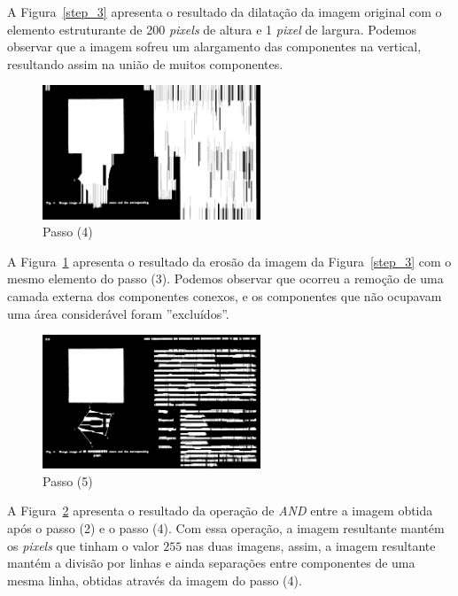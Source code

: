 \documentclass[twoside,twocolumn]{article}
\begin{document}
A Figura~\ref{step_3} apresenta o resultado da dilatação da imagem original com o elemento estruturante de 200 \textit{pixels} de altura e 1 \textit{pixel} de largura. Podemos observar que a imagem sofreu um alargamento das componentes na vertical, resultando assim na união de muitos componentes.

\begin{figure}[H]
\begin{center}
	\includegraphics[height=4cm]{figures/step_4.png}
\caption{Passo (4)} \label{step_4}
\end{center}
\end{figure}

A Figura~\ref{step_4} apresenta o resultado da erosão da imagem da Figura~\ref{step_3} com o mesmo elemento do passo (3). Podemos observar que ocorreu a remoção de uma camada externa dos componentes conexos, e os componentes que não ocupavam uma área considerável foram ''excluídos''.

\begin{figure}[H]
\begin{center}
	\includegraphics[height=4cm]{figures/step_5.png}
\caption{Passo (5)} \label{step_5}
\end{center}
\end{figure}

A Figura~\ref{step_5} apresenta o resultado da operação de \textit{AND} entre a imagem obtida após o passo (2) e o passo (4). Com essa operação, a imagem resultante mantém os \textit{pixels} que tinham o valor $255$ nas duas imagens, assim, a imagem resultante mantém a divisão por linhas e ainda separações entre componentes de uma mesma linha, obtidas através da imagem do passo (4).
\end{document}
